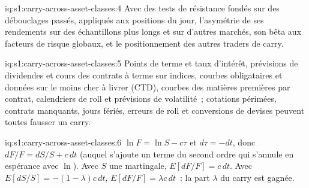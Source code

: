 \begin{solution}{iq:s1:carry-across-asset-classes:4}
Avec des tests de résistance fondés sur des débouclages passés, appliqués aux positions du jour, l'asymétrie de ses rendements sur des échantillons plus longs et sur d'autres marchés, son bêta aux
facteurs de risque globaux, et le positionnement des autres traders de carry.
\end{solution}

\begin{solution}{iq:s1:carry-across-asset-classes:5}
Points de terme et taux d'intérêt, prévisions de dividendes et cours des contrats à terme sur indices, courbes obligataires et données sur le moins cher à livrer (CTD), courbes des matières premières par contrat,
calendriers de roll et prévisions de volatilité~; cotations périmées, contrats manquants, jours fériés, erreurs de roll et conversions de devises peuvent toutes fausser un carry.
\end{solution}

\begin{solution}{iq:s1:carry-across-asset-classes:6}
$\ln F = \ln S - c\tau$ et $d\tau = -dt$, donc $dF/F = dS/S + c\,dt$ (auquel s'ajoute un terme du second ordre qui s'annule en espérance avec $\ln$). Avec $S$ une
martingale, $E[dF/F] = c\,dt$. Avec $E[dS/S] = -(1 - \lambda)c\,dt$, $E[dF/F] = \lambda c\,dt$~: la part $\lambda$ du carry est gagnée.
\end{solution}
